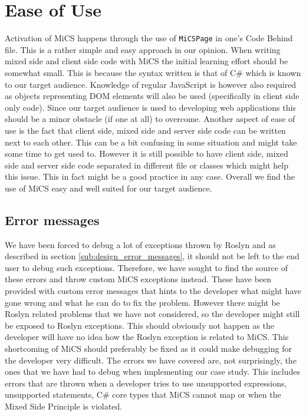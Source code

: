 \section{Ease of Use} %
\label{sec:ease_of_use}
	Activation of MiCS happens through the use of \texttt{MiCSPage} in one's Code Behind file. This is a rather simple and easy approach in our opinion. When writing mixed side and client side code with MiCS the initial learning effort should be somewhat small. This is because the syntax written is that of C\# which is known to our target audience. Knowledge of regular JavaScript is however also required as objects representing DOM elements will also be used (specifically in client side only code). Since our target audience is used to developing web applications this should be a minor obstacle (if one at all) to overcome. Another aspect of ease of use is the fact that client side, mixed side and server side code can be written next to each other. This can be a bit confusing in some situation and might take some time to get used to. However it is still possible to have client side, mixed side and server side code separated in different file or classes which might help this issue. This in fact might be a good practice in any case. Overall we find the use of MiCS easy and well suited for our target audience.

	\subsection{Error messages} %
	\label{sub:evaluation_of_error_messages}
		We have been forced to debug a lot of exceptions thrown by Roslyn and as described in section \ref{sub:design_error_messages}, it should not be left to the end user to debug such exceptions. Therefore, we have sought to find the source of these errors and throw custom MiCS exceptions instead. These have been provided with custom error messages that hints to the developer what might have gone wrong and what he can do to fix the problem. However there might be Roslyn related problems that we have not considered, so the developer might still be exposed to Roslyn exceptions. This should obviously not happen as the developer will have no idea how the Roslyn exception is related to MiCS. This shortcoming of MiCS should preferably be fixed as it could make debugging for the developer very difficult. The errors we have covered are, not surprisingly, the ones that we have had to debug when implementing our case study. This includes errors that are thrown when a developer tries to use unsupported expressions, unsupported statements, C\# core types that MiCS cannot map or when the Mixed Side Principle is violated.


